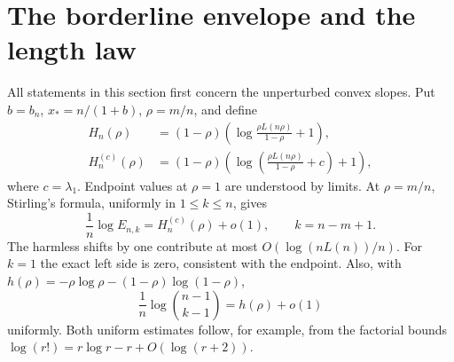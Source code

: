\documentclass[11pt,a4paper]{article}
\numberwithin{equation}{section}
\theoremstyle{definition}
\theoremstyle{remark}
\begin{document}
\section{The borderline envelope and the length law}
\label{sec:envelope}

All statements in this section first concern the unperturbed convex
slopes. Put $b=b_n$, $x_*=n/(1+b)$, $\rho=m/n$, and define
\begin{align}
 H_n(\rho)&=(1-\rho)
 \left(\log\frac{\rho L(n\rho)}{1-\rho}+1\right),
 \label{eq:H}\\
 H_n^{(c)}(\rho)&=(1-\rho)
 \left(\log\left(\frac{\rho L(n\rho)}{1-\rho}+c\right)+1\right),
 \label{eq:Hc}
\end{align}
where $c=\lambda_1$. Endpoint values at $\rho=1$ are understood by
limits. At $\rho=m/n$, Stirling's formula, uniformly in $1\le k\le n$,
gives
\begin{equation}
 \frac1n\log E_{n,k}=H_n^{(c)}(\rho)+o(1),\qquad k=n-m+1.
 \label{eq:stirling-envelope}
\end{equation}
The harmless shifts by one contribute at most $O(\log(nL(n))/n)$.
For $k=1$ the exact left side is zero, consistent with the endpoint.
Also, with $h(\rho)=-\rho\log\rho-(1-\rho)\log(1-\rho)$,
\begin{equation}
 \frac1n\log\binom{n-1}{k-1}=h(\rho)+o(1)
 \label{eq:entropy}
\end{equation}
uniformly. Both uniform estimates follow, for example, from the
factorial bounds $\log(r!)=r\log r-r+O(\log(r+2))$.
\end{document}
